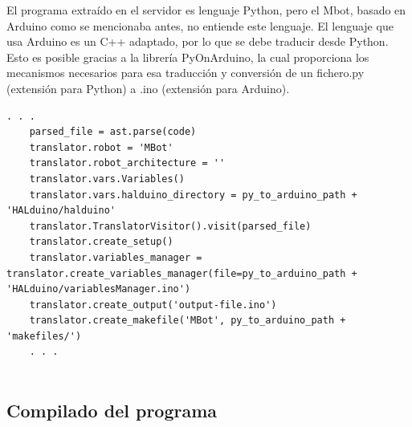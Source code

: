 \documentclass{report}
\begin{document}
El programa extraído en el servidor es lenguaje Python, pero el Mbot, basado en Arduino como se mencionaba antes, no entiende este lenguaje. El lenguaje que usa Arduino es un C++ adaptado, por lo que se debe traducir desde Python. Esto es posible gracias a la librería PyOnArduino, la cual proporciona los mecanismos necesarios para esa traducción y conversión de un fichero.py (extensión para Python) a .ino (extensión para Arduino).
\\
\begin{lstlisting}[frame=single,breaklines=true, label=Traducción de lenguaje Python a Arduino, caption=Traducción de lenguaje Python a Arduino, captionpos=b]
   . . .    
    parsed_file = ast.parse(code)
    translator.robot = 'MBot'
    translator.robot_architecture = ''
    translator.vars.Variables()
    translator.vars.halduino_directory = py_to_arduino_path + 'HALduino/halduino'
    translator.TranslatorVisitor().visit(parsed_file)
    translator.create_setup()
    translator.variables_manager = translator.create_variables_manager(file=py_to_arduino_path + 'HALduino/variablesManager.ino')
    translator.create_output('output-file.ino')
    translator.create_makefile('MBot', py_to_arduino_path + 'makefiles/')
    . . .


\end{lstlisting}

\subsection{Compilado del programa}
\end{document}
